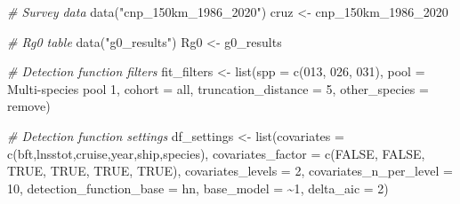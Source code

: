 \documentclass[
]{book}
\newenvironment{Shaded}{\begin{snugshade}}{\end{snugshade}}
\newcommand{\AttributeTok}[1]{\textcolor[rgb]{0.77,0.63,0.00}{#1}}
\newcommand{\CommentTok}[1]{\textcolor[rgb]{0.56,0.35,0.01}{\textit{#1}}}
\newcommand{\ConstantTok}[1]{\textcolor[rgb]{0.00,0.00,0.00}{#1}}
\newcommand{\DecValTok}[1]{\textcolor[rgb]{0.00,0.00,0.81}{#1}}
\newcommand{\FunctionTok}[1]{\textcolor[rgb]{0.00,0.00,0.00}{#1}}
\newcommand{\NormalTok}[1]{#1}
\newcommand{\OtherTok}[1]{\textcolor[rgb]{0.56,0.35,0.01}{#1}}
\newcommand{\StringTok}[1]{\textcolor[rgb]{0.31,0.60,0.02}{#1}}
\begin{document}
\begin{Shaded}
\begin{Highlighting}[]
\CommentTok{\# Survey data}
\FunctionTok{data}\NormalTok{(}\StringTok{"cnp\_150km\_1986\_2020"}\NormalTok{)}
\NormalTok{cruz }\OtherTok{\textless{}{-}}\NormalTok{ cnp\_150km\_1986\_2020}

\CommentTok{\# Rg0 table}
\FunctionTok{data}\NormalTok{(}\StringTok{"g0\_results"}\NormalTok{)}
\NormalTok{Rg0 }\OtherTok{\textless{}{-}}\NormalTok{ g0\_results}

\CommentTok{\# Detection function filters}
\NormalTok{fit\_filters }\OtherTok{\textless{}{-}} \FunctionTok{list}\NormalTok{(}\AttributeTok{spp =} \FunctionTok{c}\NormalTok{(}\StringTok{\textquotesingle{}013\textquotesingle{}}\NormalTok{, }\StringTok{\textquotesingle{}026\textquotesingle{}}\NormalTok{, }\StringTok{\textquotesingle{}031\textquotesingle{}}\NormalTok{), }
                   \AttributeTok{pool =} \StringTok{\textquotesingle{}Multi{-}species pool 1\textquotesingle{}}\NormalTok{,}
                   \AttributeTok{cohort =} \StringTok{\textquotesingle{}all\textquotesingle{}}\NormalTok{,}
                   \AttributeTok{truncation\_distance =} \DecValTok{5}\NormalTok{,}
                   \AttributeTok{other\_species =} \StringTok{\textquotesingle{}remove\textquotesingle{}}\NormalTok{)}

\CommentTok{\# Detection function settings}
\NormalTok{df\_settings }\OtherTok{\textless{}{-}} \FunctionTok{list}\NormalTok{(}\AttributeTok{covariates =} \FunctionTok{c}\NormalTok{(}\StringTok{\textquotesingle{}bft\textquotesingle{}}\NormalTok{,}\StringTok{\textquotesingle{}lnsstot\textquotesingle{}}\NormalTok{,}\StringTok{\textquotesingle{}cruise\textquotesingle{}}\NormalTok{,}\StringTok{\textquotesingle{}year\textquotesingle{}}\NormalTok{,}\StringTok{\textquotesingle{}ship\textquotesingle{}}\NormalTok{,}\StringTok{\textquotesingle{}species\textquotesingle{}}\NormalTok{),}
                   \AttributeTok{covariates\_factor =} \FunctionTok{c}\NormalTok{(}\ConstantTok{FALSE}\NormalTok{, }\ConstantTok{FALSE}\NormalTok{, }\ConstantTok{TRUE}\NormalTok{, }\ConstantTok{TRUE}\NormalTok{, }\ConstantTok{TRUE}\NormalTok{, }\ConstantTok{TRUE}\NormalTok{),}
                   \AttributeTok{covariates\_levels =} \DecValTok{2}\NormalTok{,}
                   \AttributeTok{covariates\_n\_per\_level =} \DecValTok{10}\NormalTok{,}
                   \AttributeTok{detection\_function\_base =} \StringTok{\textquotesingle{}hn\textquotesingle{}}\NormalTok{,}
                   \AttributeTok{base\_model =} \StringTok{\textquotesingle{}\textasciitilde{}1\textquotesingle{}}\NormalTok{,}
                   \AttributeTok{delta\_aic =} \DecValTok{2}\NormalTok{)}


\end{Highlighting}
\end{Shaded}
\end{document}
